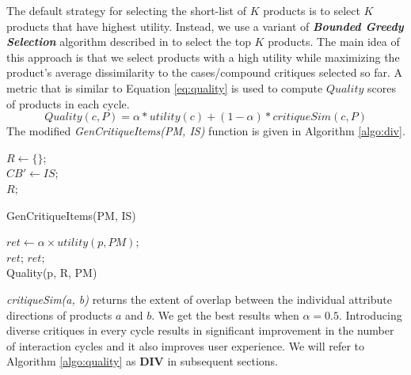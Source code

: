 The default strategy for selecting the short-list of $K$ products is to select $K$ products that have highest utility.
Instead, we use a variant of \textit{\textbf{Bounded Greedy Selection}} algorithm described in \cite{boundedGreedy} to select the top $K$ products.
The main idea of this approach is that we select products with a high utility while maximizing the product's average dissimilarity to the cases/compound critiques selected so far.
A metric that is similar to Equation \ref{eq:quality} is used to compute $Quality$ scores of products in each cycle.
\begin{equation}
\label{eq:quality2}
Quality(c, P) = \alpha * utility(c) + (1-\alpha)*critiqueSim(c, P)
\end{equation}
%
The modified \textit{GenCritiqueItems(PM, IS)} function is given in Algorithm \ref{algo:div}.
\begin{algorithm}[ht]
  \DontPrintSemicolon

  $R \gets \{\}$;\\
  $CB' \gets IS$;\\
  \Return $R;$
  \caption{GenCritiqueItems(PM, IS)}
  \label{algo:div}
\end{algorithm}

\begin{algorithm}[ht]
  \DontPrintSemicolon

  $ret \gets \alpha \times utility(p, PM)$; \\
   {\Return $ret$;}
  \Return $ret;$\\
  \caption{Quality(p, R, PM)}
  \label{algo:quality}
\end{algorithm}

\textit{critiqueSim(a, b)} returns the extent of overlap between the individual attribute directions of products $a$ and $b$.
We get the best results when $\alpha = 0.5$.
Introducing diverse critiques in every cycle results in significant improvement in the number of interaction cycles and it also improves user experience.
We will refer to Algorithm \ref{algo:quality} as \textbf{DIV} in subsequent sections.



